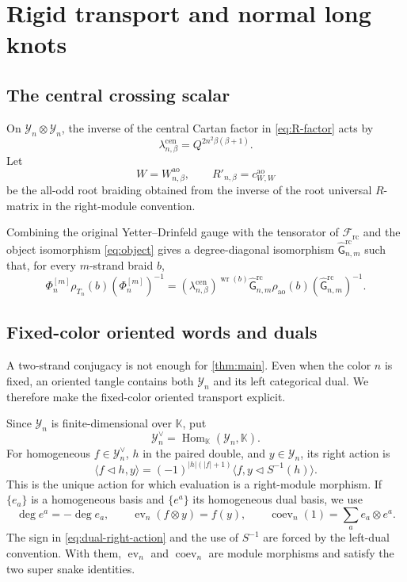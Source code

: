 \documentclass[11pt,a4paper]{article}
\newcommand{\hK}{\mathbb K}
\newcommand{\ot}{\otimes}
\newcommand{\tri}{\mathbin{\triangleleft}}
\newcommand{\ev}{\operatorname{ev}}
\newcommand{\coev}{\operatorname{coev}}
\newcommand{\Writhe}{\operatorname{wr}}
\newcommand{\ao}{\mathrm{ao}}
\newcommand{\rc}{\mathrm{rc}}
\newcommand{\cen}{\mathrm{cen}}
\theoremstyle{definition}
\theoremstyle{remark}
\begin{document}
\section{Rigid transport and normal long knots}\label{sec:rigid}

\subsection{The central crossing scalar}

On \(\mathcal Y_n\ot\mathcal Y_n\), the inverse of the central Cartan
factor in \eqref{eq:R-factor} acts by
\begin{equation}\label{eq:lambda}
 \lambda_{n,\beta}^{\cen}
 =Q^{2n^2\beta(\beta+1)}.
\end{equation}
Let
\[
 W=W_{n,\beta}^{\ao},\qquad
 R'_{n,\beta}=c^{\ao}_{W,W}
\]
be the all-odd root braiding obtained from the inverse of the root
universal \(R\)-matrix in the right-module convention.

Combining the original Yetter--Drinfeld gauge with the tensorator of
\(\mathcal F_{\rc}\) and the object isomorphism \eqref{eq:object} gives a
degree-diagonal isomorphism \(\widehat{\mathsf G}_{n,m}^{\rc}\) such that,
for every \(m\)-strand braid \(b\),
\begin{equation}\label{eq:braid-root-comparison}
\Phi_n^{[m]}\rho_{T_n}(b)(\Phi_n^{[m]})^{-1}
=
(\lambda_{n,\beta}^{\cen})^{\Writhe(b)}
\widehat{\mathsf G}_{n,m}^{\rc}
\rho_{\ao}(b)
(\widehat{\mathsf G}_{n,m}^{\rc})^{-1}.
\end{equation}

\subsection{Fixed-color oriented words and duals}
\label{sec:oriented-fixed-color}

A two-strand conjugacy is not enough for \cref{thm:main}.  Even when the
color \(n\) is fixed, an oriented tangle contains both \(\mathcal Y_n\)
and its left categorical dual.  We therefore make the fixed-color
oriented transport explicit.

Since \(\mathcal Y_n\) is finite-dimensional over \(\hK\), put
\[
 \mathcal Y_n^\vee=\operatorname{Hom}_{\hK}(\mathcal Y_n,\hK).
\]
For homogeneous \(f\in\mathcal Y_n^\vee\), \(h\) in the paired double,
and \(y\in\mathcal Y_n\), its right action is
\begin{equation}\label{eq:dual-right-action}
 \langle f\tri h,y\rangle
 =
 (-1)^{|h|(|f|+1)}
 \langle f,y\tri S^{-1}(h)\rangle.
\end{equation}
This is the unique action for which evaluation is a right-module
morphism.  If \(\{e_a\}\) is a homogeneous basis and \(\{e^a\}\) its
homogeneous dual basis, we use
\begin{equation}\label{eq:dual-degree-cups}
 \deg e^a=-\deg e_a,\qquad
 \ev_n(f\ot y)=f(y),\qquad
 \coev_n(1)=\sum_a e_a\ot e^a.
\end{equation}
The sign in \eqref{eq:dual-right-action} and the use of \(S^{-1}\) are
forced by the left-dual convention.  With them, \(\ev_n\) and
\(\coev_n\) are module morphisms and satisfy the two super snake
identities.
\end{document}
